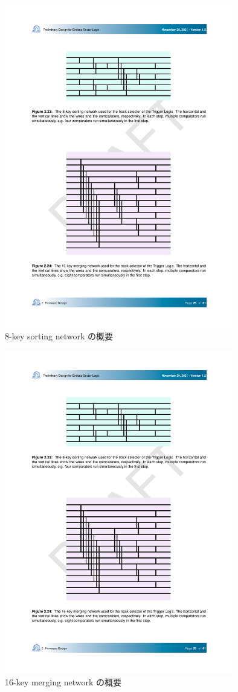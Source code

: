 \begin{figure} 
\centering
\includegraphics[width=10cm]{fig/SL/Sortiing_8key.pdf}
\caption[8-key sorting network の概要]{8-key sorting network の概要}
\label{Sortiing_8key}
\end{figure}

\begin{figure} 
\centering
\includegraphics[width=10cm]{fig/SL/Sorting_16.pdf}
\caption[16-key merging network の概要]{16-key merging network の概要}
\label{Sorting_16}
\end{figure}


